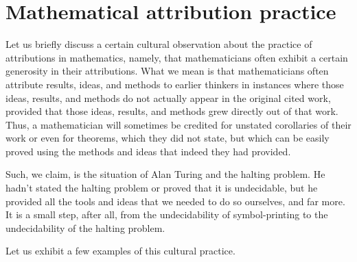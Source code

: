 \documentclass[12pt]{amsart}
\begin{document}
\section{Mathematical attribution practice}

Let us briefly discuss a certain cultural observation about the practice of attributions in mathematics, namely, that mathematicians often exhibit a certain generosity in their attributions. What we mean is that mathematicians often attribute results, ideas, and methods to earlier thinkers in instances where those ideas, results, and methods do not actually appear in the original cited work, provided that those ideas, results, and methods grew directly out of that work. Thus, a mathematician will sometimes be credited for unstated corollaries of their work or even for theorems, which they did not state, but which can be easily proved using the methods and ideas that indeed they had provided.

Such, we claim, is the situation of Alan Turing and the halting problem. He hadn't stated the halting problem or proved that it is undecidable, but he provided all the tools and ideas that we needed to do so ourselves, and far more. It is a small step, after all, from the undecidability of symbol-printing to the undecidability of the halting problem.

Let us exhibit a few examples of this cultural practice.
\end{document}
